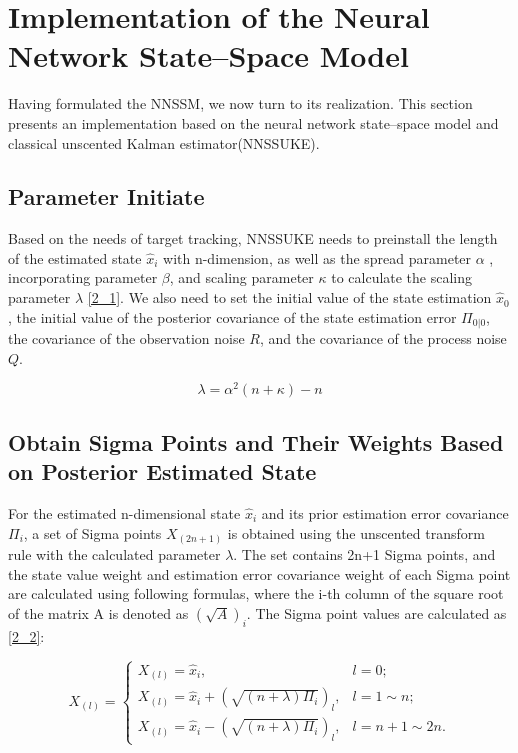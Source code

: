 \documentclass[sn-nature]{sn-jnl}%
\theoremstyle{thmstyleone}%
\theoremstyle{thmstyletwo}%
\theoremstyle{thmstylethree}%
\begin{document}
\section{Implementation of the Neural Network State–Space Model}\label{sec3}

Having formulated the NNSSM, we now turn to its realization. This section presents an implementation based on the neural network state–space model and classical unscented Kalman estimator(NNSSUKE).
 

\subsection{Parameter Initiate}
Based on the needs of target tracking, NNSSUKE needs to preinstall the length of the estimated state ${{{\hat x}_i}}$  with n-dimension, as well as the spread parameter $\alpha $ , incorporating parameter $\beta $, and scaling parameter $\kappa $ to calculate the scaling parameter $\lambda $ \eqref{2_1}. We also need to set the initial value of the state estimation ${{\hat x}_0}$, the initial value of the posterior covariance of the state estimation error ${\Pi _{0|0}}$, the covariance of the observation noise $R$, and the covariance of the process noise  $Q$.


\begin{equation}
\lambda  = {\alpha ^2}(n + \kappa ) - n
\label{2_1}
\end{equation}

\subsection{Obtain Sigma Points and Their Weights Based on Posterior Estimated State}

For the estimated n-dimensional state ${{{\hat x}_i}}$ and its prior estimation error covariance ${{\Pi _i}}$, a set of Sigma points ${X_{(2n + 1)}}$ is obtained using the unscented transform rule with the calculated parameter $\lambda $. The set contains 2n+1 Sigma points, and the state value weight and estimation error covariance weight of each Sigma point are calculated using following formulas, where the i-th column of the square root of the matrix A is denoted as ${(\sqrt A )_i}$.
The Sigma point values are calculated as \eqref{2_2}:

\begin{equation}
{X_{(l)}} = \left\{ {\begin{array}{*{20}{c}}
{{X_{(l)}} = {{\hat x}_i},}&{l = 0};\\
{{X_{(l)}} = {{\hat x}_i} + {{(\sqrt {(n + \lambda ){\Pi _i}} )}_l},}&{l = 1\sim n};\\
{{X_{(l)}} = {{\hat x}_i} - {{(\sqrt {(n + \lambda ){\Pi _i}} )}_l},}&{l = n + 1\sim 2n}.
\end{array}} \right.
\label{2_2}
\end{equation}
\end{document}
